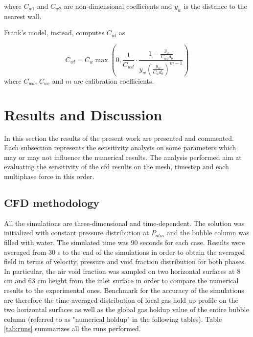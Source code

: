 \documentclass[11pt,a4paper]{article}
\begin{document}
where $C_{w 1}$ and $C_{w 2}$ are non-dimensional coefficients and $y_{w}$ is the distance to the nearest wall.

Frank's model, instead, computes $C_{w l}$ as

\begin{equation}
C_{w l}=C_{w} \max \left(0, \frac{1}{C_{w d}} \cdot \frac{1-\frac{y_{w}}{C_{w d} d_{b}}}{y_{w}\left(\frac{y_{w}}{C_{w} d_{b}}\right)^{m-1}}\right)
\end{equation}
where $C_{w d}$, $C_{w c}$ and $m$ are calibration coefficients.




\section{Results and Discussion}
\label{sec:results}
In this section the results of the present work are presented and commented. Each subsection represents the sensitivity analysis on some parameters which may or may not influence the numerical results. The analysis performed aim at evaluating the sensitivity of the cfd results on the mesh, timestep and each multiphase force in this order.

\subsection{CFD methodology}
\label{sub:methodology}

All the simulations are three-dimensional and time-dependent. The solution was initialized with constant pressure distribution at $P_{atm}$ and the bubble column was filled with water. The simulated time was 90 seconds for each case. Results were averaged from 30 s to the end of the simulations in order to obtain the averaged field in terms of velocity, pressure and void fraction distribution for both phases. In particular, the air void fraction was sampled on two horizontal surfaces at 8 cm and 63 cm height from the inlet surface in order to compare the numerical results to the experimental ones. Benchmark for the accuracy of the simulations are therefore the time-averaged distribution of local gas hold up profile on the two horizontal surfaces as well as the global gas holdup value of the entire bubble column (referred to as "numerical holdup" in the following tables). Table \ref{tab:runs} summarizes all the runs performed.
\end{document}
